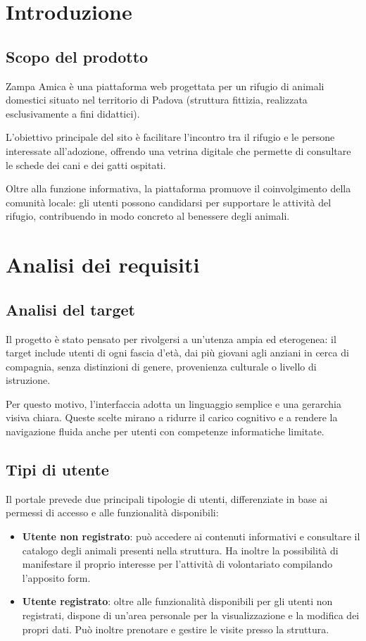 \documentclass[10pt, letterpaper]{article}
\begin{document}
\newpage
\tableofcontents

\newpage
\section{Introduzione}
\subsection{Scopo del prodotto}
Zampa Amica è una piattaforma web progettata per un rifugio di animali domestici situato nel territorio di Padova (struttura fittizia, realizzata esclusivamente a fini didattici).

L’obiettivo principale del sito è facilitare l’incontro tra il rifugio e le persone interessate all’adozione, offrendo una vetrina digitale che permette di consultare le schede dei cani e dei gatti ospitati.

Oltre alla funzione informativa, la piattaforma promuove il coinvolgimento della comunità locale: gli utenti possono candidarsi per supportare le attività del rifugio, contribuendo in modo concreto al benessere degli animali.

\section{Analisi dei requisiti}
\subsection{Analisi del target}
Il progetto è stato pensato per rivolgersi a un’utenza ampia ed eterogenea: il target include utenti di ogni fascia d’età, dai più giovani agli anziani in cerca di compagnia, senza distinzioni di genere, provenienza culturale o livello di istruzione.

Per questo motivo, l’interfaccia adotta un linguaggio semplice e una gerarchia visiva chiara. Queste scelte mirano a ridurre il carico cognitivo e a rendere la navigazione fluida anche per utenti con competenze informatiche limitate.

\subsection{Tipi di utente}
Il portale prevede due principali tipologie di utenti, differenziate in base ai permessi di accesso e alle funzionalità disponibili:
\begin{itemize}
    \item \textbf{Utente non registrato}: può accedere ai contenuti informativi e consultare il catalogo degli animali presenti nella struttura. Ha inoltre la possibilità di manifestare il proprio interesse per l’attività di volontariato compilando l’apposito form.
    \item \textbf{Utente registrato}: oltre alle funzionalità disponibili per gli utenti non registrati, dispone di un’area personale per la visualizzazione e la modifica dei propri dati. Può inoltre prenotare e gestire le visite presso la struttura.
\end{itemize}
\end{document}
